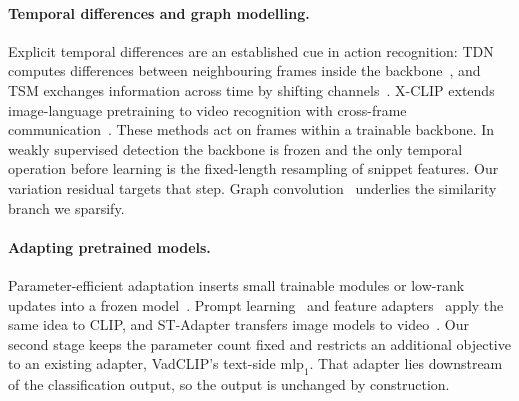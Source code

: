 \paragraph{Temporal differences and graph modelling.}
Explicit temporal differences are an established cue in action recognition: TDN computes differences between neighbouring frames inside the backbone~\cite{wang2021tdn}, and TSM exchanges information across time by shifting channels~\cite{lin2019tsm}. X-CLIP extends image-language pretraining to video recognition with cross-frame communication~\cite{ni2022xclip}. These methods act on frames within a trainable backbone. In weakly supervised detection the backbone is frozen and the only temporal operation before learning is the fixed-length resampling of snippet features. Our variation residual targets that step. Graph convolution~\cite{kipf2017gcn} underlies the similarity branch we sparsify.

\paragraph{Adapting pretrained models.}
Parameter-efficient adaptation inserts small trainable modules or low-rank updates into a frozen model~\cite{houlsby2019adapter,hu2021lora}. Prompt learning~\cite{zhou2022coop} and feature adapters~\cite{gao2024clipadapter} apply the same idea to CLIP, and ST-Adapter transfers image models to video~\cite{pan2022stadapter}. Our second stage keeps the parameter count fixed and restricts an additional objective to an existing adapter, VadCLIP's text-side $\mathrm{mlp}_1$. That adapter lies downstream of the classification output, so the output is unchanged by construction.
